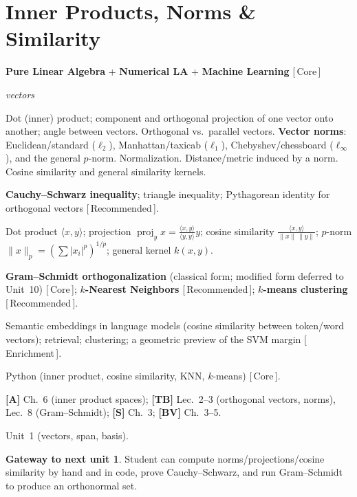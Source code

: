 \documentclass[11pt]{article}
\newcommand{\dom}[1]{{\sffamily\bfseries\color{RoyalBlue}#1}}
\newcommand{\pri}[1]{{\footnotesize\sffamily\color{BrickRed}[\,#1\,]}}
\newcommand{\obj}[1]{{\itshape #1}}
\newenvironment{unitfields}
  {\begin{description}[leftmargin=0pt,labelindent=0pt,style=nextline,
      font=\normalfont\sffamily\bfseries\color{RoyalBlue},itemsep=3pt,topsep=4pt]}
  {\end{description}}
\newcommand{\ff}[1]{\item[#1]}
\theoremstyle{definition}
\newtheorem*{gateway}{Gateway to next unit}
\begin{document}
\section{Inner Products, Norms \& Similarity}
\begin{unitfields}
\ff{Domain(s)} \dom{Pure Linear Algebra} + \dom{Numerical LA} + \dom{Machine Learning} \pri{Core}
\ff{Primary object(s)} \obj{vectors}
\ff{Topics}
  Dot (inner) product; component and orthogonal projection of one vector onto
  another; angle between vectors. Orthogonal vs.\ parallel vectors.
  \textbf{Vector norms}: Euclidean/standard ($\ell_2$), Manhattan/taxicab
  ($\ell_1$), Chebyshev/chessboard ($\ell_\infty$), and the general $p$-norm.
  Normalization. Distance/metric induced by a norm. Cosine similarity and
  general similarity kernels.
\ff{Key theorems}
  \textbf{Cauchy--Schwarz inequality}; triangle inequality; Pythagorean
  identity for orthogonal vectors \pri{Recommended}.
\ff{Tools / formulas}
  Dot product $\langle x,y\rangle$; projection
  $\operatorname{proj}_y x=\frac{\langle x,y\rangle}{\langle y,y\rangle}y$;
  cosine similarity $\frac{\langle x,y\rangle}{\|x\|\,\|y\|}$; $p$-norm
  $\|x\|_p=(\sum|x_i|^p)^{1/p}$; general kernel $k(x,y)$.
\ff{Algorithms}
  \textbf{Gram--Schmidt orthogonalization} (classical form; modified form
  deferred to Unit~10) \pri{Core};
  \textbf{$k$-Nearest Neighbors} \pri{Recommended};
  \textbf{$k$-means clustering} \pri{Recommended}.
\ff{Applications}
  Semantic embeddings in language models (cosine similarity between token/word
  vectors); retrieval; clustering; a geometric preview of the SVM margin
  \pri{Enrichment}.
\ff{Languages}
  Python (inner product, cosine similarity, KNN, $k$-means) \pri{Core}.
\ff{Textbook refs}
  \textbf{[A]} Ch.~6 (inner product spaces);
  \textbf{[TB]} Lec.~2--3 (orthogonal vectors, norms), Lec.~8 (Gram--Schmidt);
  \textbf{[S]} Ch.~3; \textbf{[BV]} Ch.~3--5.
\ff{ENTER} Unit~1 (vectors, span, basis).
\end{unitfields}
\begin{gateway}
Student can compute norms/projections/cosine similarity by hand and in code,
prove Cauchy--Schwarz, and run Gram--Schmidt to produce an orthonormal set.
\end{gateway}

\end{document}
